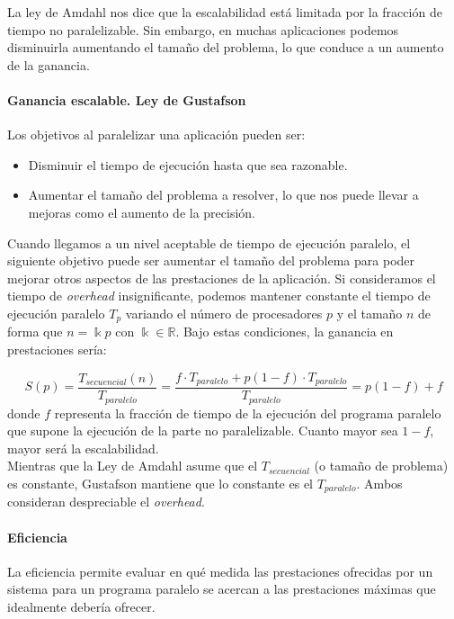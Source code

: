 \documentclass[12pt,spanish]{article}
\begin{document}
La ley de Amdahl nos dice que la escalabilidad está limitada por la fracción de tiempo no paralelizable. Sin embargo, en muchas aplicaciones podemos disminuirla aumentando el tamaño del problema, lo que conduce a un aumento de la ganancia.

\paragraph{Ganancia escalable. Ley de Gustafson}

Los objetivos al paralelizar una aplicación pueden ser:
\begin{itemize}
	\item Disminuir el tiempo de ejecución hasta que sea razonable.
	\item Aumentar el tamaño del problema a resolver, lo que nos puede llevar a mejoras como el aumento de la precisión.
\end{itemize}

Cuando llegamos a un nivel aceptable de tiempo de ejecución paralelo, el siguiente objetivo puede ser aumentar el tamaño del problema para poder mejorar otros aspectos de las prestaciones de la aplicación. Si consideramos el tiempo de \textit{overhead} insignificante, podemos mantener constante el tiempo de ejecución paralelo $T_p$ variando el número de procesadores $p$ y el tamaño $n$ de forma que $n=\Bbbk p$ con $\Bbbk \in \mathbb{R}$. Bajo estas condiciones, la ganancia en prestaciones sería:

\begin{equation}
S(p)=\frac{T_{secuencial}(n)}{T_{paralelo}}=\frac{f \cdot T_{paralelo} + p(1-f) \cdot T_{paralelo}}{T_{paralelo}}= p(1-f) + f
\end{equation}
donde $f$ representa la fracción de tiempo de la ejecución del programa paralelo que supone la ejecución de la parte no paralelizable. Cuanto mayor sea $1-f$, mayor será la escalabilidad.\\

Mientras que la Ley de Amdahl asume que el $T_{secuencial}$ (o tamaño de problema) es constante, Gustafson mantiene que lo constante es el $T_{paralelo}$. Ambos consideran despreciable el \textit{overhead}.

\paragraph{Eficiencia}

La eficiencia permite evaluar en qué medida las prestaciones ofrecidas por un sistema para un programa paralelo se acercan a las prestaciones máximas que idealmente debería ofrecer.
\end{document}
